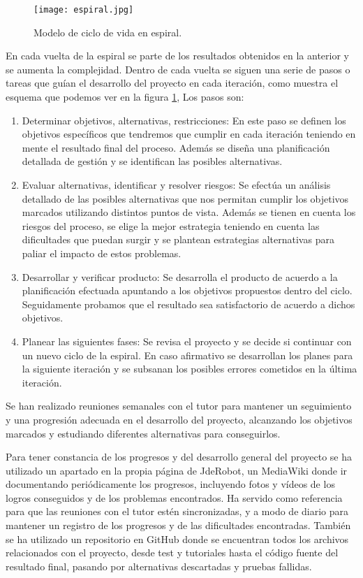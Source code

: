 \begin{figure}[hb]
	\centering\texttt{[image: espiral.jpg]}
	\caption{Modelo de ciclo de vida en espiral.}
	\label{fig:espiral}
\end{figure}

En cada vuelta de la espiral se parte de los resultados obtenidos en la anterior y se aumenta la complejidad. Dentro de cada vuelta se siguen una serie de pasos o tareas que guían el desarrollo del proyecto en cada iteración, como muestra el esquema que podemos ver en la figura \ref{fig:espiral}, Los pasos son:
\begin{enumerate}[1.]
	\item Determinar objetivos, alternativas, restricciones: En este paso se definen los objetivos específicos que tendremos que cumplir en cada iteración teniendo en mente el resultado final del proceso. Además se diseña una planificación detallada de gestión y se identifican las posibles alternativas. 
	
	\item Evaluar alternativas, identificar y resolver riesgos: Se efectúa un análisis detallado de las posibles alternativas que nos permitan cumplir los objetivos marcados utilizando distintos puntos de vista. Además se tienen en cuenta los riesgos del proceso, se elige la mejor estrategia teniendo en cuenta las dificultades que puedan surgir y se plantean estrategias alternativas para paliar el impacto de estos problemas.
	
	\item Desarrollar y verificar producto: Se desarrolla el producto de acuerdo a la planificación efectuada apuntando a los objetivos propuestos dentro del ciclo. Seguidamente probamos que el resultado sea satisfactorio de acuerdo a dichos objetivos.
	
	\item Planear las siguientes fases: Se revisa el proyecto y se decide si continuar con un nuevo ciclo de la espiral. En caso afirmativo se desarrollan los planes para la siguiente iteración y se subsanan los posibles errores cometidos en la última iteración.
	
\end{enumerate}

Se han realizado reuniones semanales con el tutor para mantener un seguimiento y una progresión adecuada en el desarrollo del proyecto, alcanzando los objetivos marcados y estudiando diferentes alternativas para conseguirlos.

Para tener constancia de los progresos y del desarrollo general del proyecto se ha utilizado un apartado en la propia página de JdeRobot, un MediaWiki\cite{mediawiki} donde ir documentando periódicamente los progresos, incluyendo fotos y vídeos de los logros conseguidos y de los problemas encontrados. Ha servido como referencia para que las reuniones con el tutor estén sincronizadas, y a modo de diario para mantener un registro de los progresos y de las dificultades encontradas. También se ha utilizado un repositorio en GitHub\cite{mirepo} donde se encuentran todos los archivos relacionados con el proyecto, desde test y tutoriales hasta el código fuente del resultado final, pasando por alternativas descartadas y pruebas fallidas.

